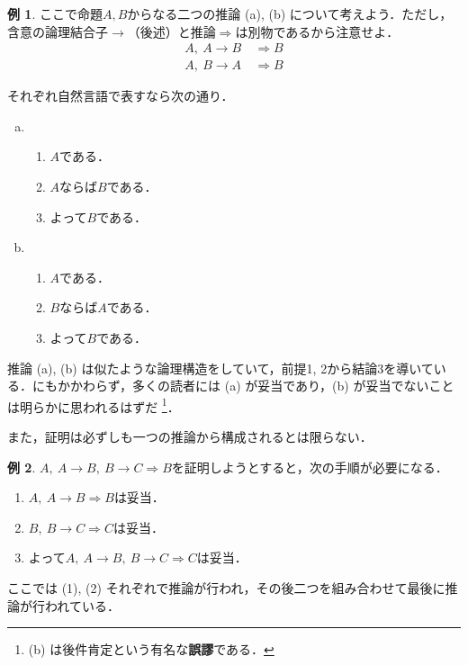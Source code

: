\documentclass[uplatex,a4paper,dvipdfmx]{jsarticle}
\theoremstyle{definition}
\newtheorem{example}{例}
\begin{document}
        \begin{example}
            ここで命題$A, B$からなる二つの推論 (a), (b) について考えよう．ただし，含意の論理結合子$\to$（後述）と推論$\Rightarrow$は別物であるから注意せよ．
            \begin{align}
                A,\ A \to B\ &\Longrightarrow  B \tag{a} \\
                A,\ B \to A\ &\Longrightarrow  B \tag{b}
            \end{align}

            それぞれ自然言語で表すなら次の通り．

            \begin{enumerate}[(a)]
                \item \begin{enumerate}[1.]
                        \item $A$である．
                        \item $A$ならば$B$である．
                        \item よって$B$である．
                    \end{enumerate}
                \item \begin{enumerate}[1.]
                        \item $A$である．
                        \item $B$ならば$A$である．
                        \item よって$B$である．
                    \end{enumerate}
            \end{enumerate}
            推論 (a), (b) は似たような論理構造をしていて，前提1, 2から結論3を導いている．にもかかわらず，多くの読者には (a) が妥当であり，(b) が妥当でないことは明らかに思われるはずだ
            \footnote{(b) は後件肯定という有名な\textbf{誤謬}である．}．
        \end{example}
            また，証明は必ずしも一つの推論から構成されるとは限らない．

        \begin{example}\label{ex:abc}
            $A,\ A \to B,\ B \to C \Longrightarrow B$を証明しようとすると，次の手順が必要になる．
            \begin{enumerate}
                \item $A,\ A \to B \Longrightarrow B$は妥当．
                \item $B,\ B \to C \Longrightarrow C$は妥当．
                \item よって$A,\ A \to B,\ B \to C \Longrightarrow C$は妥当．
            \end{enumerate}
            ここでは (1), (2) それぞれで推論が行われ，その後二つを組み合わせて最後に推論が行われている．
        \end{example}
\end{document}
